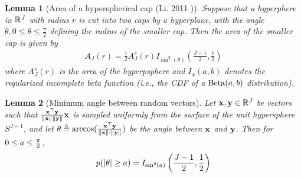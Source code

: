 \documentclass[]{article}
\newtheorem{lemma}{Lemma}[section]
\begin{document}
\begin{lemma}[Area of a hyperspherical cap (Li. 2011 \cite{hypersphericalCap})] \label{thm:cap_area}
Suppose that a hyperphere in $\mathbb{R}^J$ with radius $r$ is cut into two caps by a hyperplane, with the angle $\theta, 0 \le \theta \le \frac{\pi}{2}$ defining the radius of the smaller cap. Then the area of the smaller cap is given by
\begin{align}
    A_J(r) = \frac{1}{2} A^s_J(r) I_{\sin^2(\theta)} \left( \frac{J-1}{2}, \frac{1}{2} \right)
\end{align}
where $A^s_J(r)$ is the area of the hyperpsphere and $I_x(a, b)$ denotes the regularized incomplete beta function (i.e., the CDF of a $\operatorname{Beta}(a, b)$ distribution).
\end{lemma}


\begin{lemma}[Minimum angle between random vectors] \label{thm:rand_angle}
Let $\mathbf{x}, \mathbf{y} \in \mathbb{R}^J$ be vectors such that $\frac{\mathbf{x}^\top\mathbf{y}}{\lVert\mathbf{x}\rVert\lVert\mathbf{y}\rVert} \mathbf{x}$ is sampled uniformly from the surface of the unit hypersphere $S^{J-1}$, and let $\theta \triangleq \arccos(\frac{\mathbf{x}^\top\mathbf{y}}{\lVert\mathbf{x}\rVert \cdot \lVert\mathbf{y}\rVert })$ be the angle between $\mathbf{x}$ and $\mathbf{y}$. Then for $0 \le a \le \frac{\pi}{2}$,
\begin{align} \label{eq:rand_angle}
    p(\lvert\theta\rvert \ge a) = I_{\sin^2(a)} \left( \frac{J-1}{2}, \frac{1}{2} \right)
\end{align}
\end{lemma}
\end{document}

